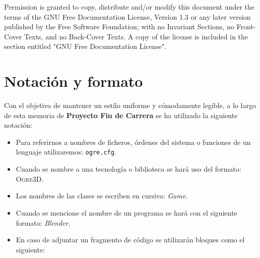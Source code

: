 Permission is granted to copy, distribute and/or modify this document under the
terms of the GNU Free Documentation License, Version 1.3 or any later version
published by the Free Software Foundation; with no Invariant Sections, no
Front-Cover Texts, and no Back-Cover Texts. A copy of the license is included in
the section entitled "GNU Free Documentation License".\\

\cleardoublepage

\section*{Notación y formato}

Con el objetivo de mantener un estilo uniforme y cómodamente legible, a lo
largo de esta memoria de \textbf{Proyecto Fin de Carrera} se ha utilizado la
siguiente notación:

\begin{itemize}
    \item Para referirnos a nombres de ficheros, órdenes del sistema o
    funciones de un lenguaje utilizaremos: \texttt{ogre.cfg}.
    \item Cuando se nombre a una tecnología o biblioteca se hará uso del
    formato: \textsc{Ogre3D}.
    \item Los nombres de las clases se escriben en cursiva: \textit{Game}.
    \item Cuando se mencione el nombre de un programa se hará con el
    siguiente formato: \textit{Blender}.
    \item En caso de adjuntar un fragmento de código se utilizarán bloques
    como el siguiente:
    
\end{itemize}
